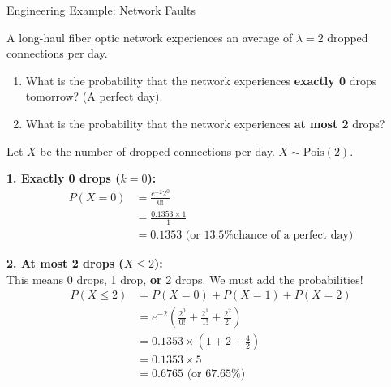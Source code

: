 \begin{frame}[allowframebreaks]{Engineering Example: Network Faults}
    \begin{example}
        A long-haul fiber optic network experiences an average of $\lambda = 2$ dropped connections per day. 
        
        \vspace{0.2cm}
        \begin{enumerate}
            \item What is the probability that the network experiences \textbf{exactly 0} drops tomorrow? (A perfect day).
            \item What is the probability that the network experiences \textbf{at most 2} drops?
        \end{enumerate}
    \end{example}

    \framebreak

    \begin{solution}
        Let $X$ be the number of dropped connections per day. $X \sim \text{Pois}(2)$.
        
        \vspace{0.2cm}
        \textbf{1. Exactly 0 drops ($k=0$):}
        \begin{align*}
            P(X=0) &= \frac{e^{-2} 2^0}{0!} \\
                   &= \frac{0.1353 \times 1}{1} \\
                   &= \mathbf{0.1353} \text{ (or 13.5\% chance of a perfect day)}
        \end{align*}
    \end{solution}
    
    \framebreak
    
    \begin{solution}
        \textbf{2. At most 2 drops ($X \leq 2$):}
        \vspace{0.1cm} \\
        This means 0 drops, 1 drop, \textbf{or} 2 drops. We must add the probabilities!
        \begin{align*}
            P(X \leq 2) &= P(X=0) + P(X=1) + P(X=2) \\
                        &= e^{-2} \left( \frac{2^0}{0!} + \frac{2^1}{1!} + \frac{2^2}{2!} \right) \\
                        &= 0.1353 \times \left( 1 + 2 + \frac{4}{2} \right) \\
                        &= 0.1353 \times 5 \\
                        &= \mathbf{0.6765} \text{ (or 67.65\%)}
        \end{align*}
    \end{solution}
\end{frame}

